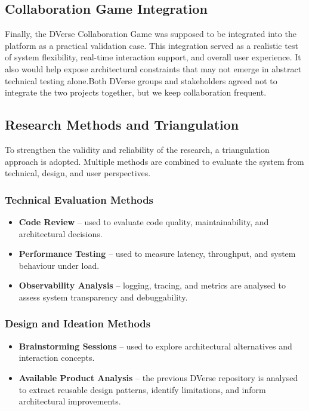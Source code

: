 \documentclass[11pt]{article}
\begin{document}
\subsection{Collaboration Game Integration}

Finally, the DVerse Collaboration Game was supposed to be integrated into the platform as a practical validation case. This integration served as a realistic test of system flexibility, real-time interaction support, and overall user experience. It also would help expose architectural constraints that may not emerge in abstract technical testing alone.Both DVerse groups and stakeholders agreed not to integrate the two projects together, but we keep collaboration frequent.

\subsection{Research Methods and Triangulation}

To strengthen the validity and reliability of the research, a triangulation approach is adopted. Multiple methods are combined to evaluate the system from technical, design, and user perspectives.

\subsubsection{Technical Evaluation Methods}

\begin{itemize}
    \item \textbf{Code Review} – used to evaluate code quality, maintainability, and architectural decisions.
    \item \textbf{Performance Testing} – used to measure latency, throughput, and system behaviour under load.
    \item \textbf{Observability Analysis} – logging, tracing, and metrics are analysed to assess system transparency and debuggability.
\end{itemize}

\subsubsection{Design and Ideation Methods}

\begin{itemize}
    \item \textbf{Brainstorming Sessions} – used to explore architectural alternatives and interaction concepts.
    \item \textbf{Available Product Analysis} – the previous DVerse repository is analysed to extract reusable design patterns, identify limitations, and inform architectural improvements.
\end{itemize}
\end{document}
